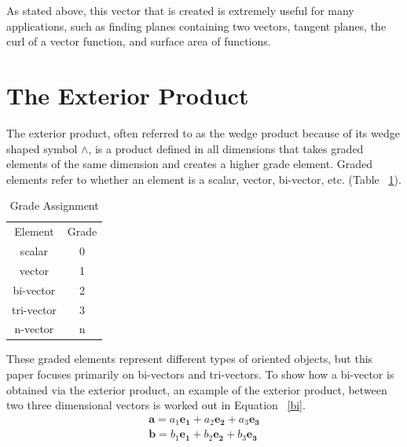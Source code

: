 \documentclass{amsart}
\begin{document}
	As stated above, this vector that is created is extremely useful for many applications, such as finding planes containing two vectors, tangent planes, the curl of a vector function, and surface area of functions.
	
	
	\section{The Exterior Product} \label{ext}
		The exterior product, often referred to as the wedge product because of its wedge shaped symbol $\wedge$, is a product defined in all dimensions that takes graded elements of the same dimension and creates a higher grade element. Graded elements refer to whether an element is a scalar, vector, bi-vector, etc. (Table ~\ref{tb:1}).
		
		\begin{table}[h]
			\caption{Grade Assignment}
			\label{tb:1}
			\begin{tabular}{c | c}
				Element & Grade\\
				scalar & 0\\
				vector & 1\\
				bi-vector & 2\\
				tri-vector & 3\\
				n-vector & n
			\end{tabular}
		\end{table}
	
		These graded elements represent different types of oriented objects, but this paper focuses primarily on bi-vectors and tri-vectors. To show how a bi-vector is obtained via the exterior product, an example of the exterior product, between two three dimensional vectors is worked out in Equation ~\ref{bi}.\\

		\begin{gather*}
				\mathbf{a} = a_1 \mathbf{e_1} + a_2 \mathbf{e_2} + a_3 \mathbf{e_3} \nonumber\\
				\mathbf{b} = b_1 \mathbf{e_1} + b_2 \mathbf{e_2} + b_3 \mathbf{e_3} \nonumber\\
		\end{gather*}
	
\end{document}
